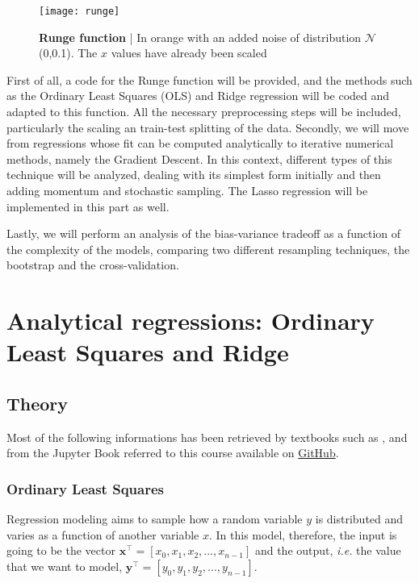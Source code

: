 \documentclass[11pt,a4paper,twocolumn]{article}
\begin{document}
\begin{figure}
	\centering
	\texttt{[image: runge]}
	\caption{\textbf{Runge function} | In orange with an added noise of distribution $\mathcal{N}$(0,0.1). The $x$ values have already been scaled}
	\label{fig:runge}
\end{figure} 

First of all, a code for the Runge function will be provided, and the methods such as the Ordinary Least Squares (OLS) and Ridge regression will be coded and adapted to this function. All the necessary preprocessing steps will be included, particularly the scaling an train-test splitting of the data. Secondly, we will move from regressions whose fit can be computed analytically to iterative numerical methods, namely the Gradient Descent. In this context, different types of this technique will be analyzed, dealing with its simplest form initially and then adding momentum and stochastic sampling. The Lasso regression will be implemented in this part as well.

Lastly, we will perform an analysis of the bias-variance tradeoff as a function of the complexity of the models, comparing two different resampling techniques, the bootstrap and the cross-validation.

\section{Analytical regressions: Ordinary Least Squares and Ridge}

\subsection{Theory} \label{s:theoryols}

Most of the following informations has been retrieved by textbooks such as \cite{hastie_stat2009}, and from the Jupyter Book referred to this course available on \href{https://compphysics.github.io/MachineLearning/doc/LectureNotes/_build/html/intro.html}{GitHub}.

\subsubsection{Ordinary Least Squares}
Regression modeling aims to sample how a random variable $y$ is distributed and varies as a function of another variable $x$. In this model, therefore, the input is going to be the vector $\boldsymbol{x}^\intercal=[x_0,x_1,x_2,\dots,x_{n-1}]$ and the output, \emph{i.e.} the value that we want to model, $\boldsymbol{y}^\intercal=[y_0,y_1,y_2,\dots,y_{n-1}]$.
\end{document}
